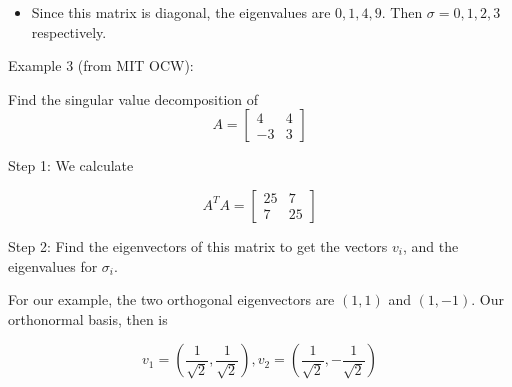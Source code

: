 \documentclass{article}
\begin{document}
\begin{itemize}
	\item Since this matrix is diagonal, the eigenvalues are $0, 1, 4, 9$. Then $\sigma=0,1,2,3$ respectively.
\end{itemize}

Example 3 (from MIT OCW):

Find the singular value decomposition of $$A=\begin{bmatrix}
		4  & 4 \\
		-3 & 3
\end{bmatrix}$$

Step 1: We calculate

$$
A^TA=\begin{bmatrix}
	25 & 7 \\ 
	7 & 25
\end{bmatrix}
$$

Step 2: Find the eigenvectors of this matrix to get the vectors $v_i$, and the eigenvalues for $\sigma_i$.

For our example, the two orthogonal eigenvectors are $(1, 1)$ and $(1, -1)$. Our orthonormal basis, then is

$$
v_1=\left(\frac{1}{\sqrt{2}}, \frac{1}{\sqrt{2}}\right), v_2=\left(\frac{1}{\sqrt{2}}, -\frac{1}{\sqrt{2}}\right)
$$
\end{document}
